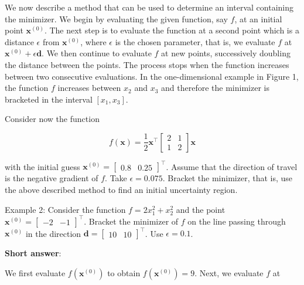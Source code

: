 We now describe a method that can be used to determine an interval containing the minimizer. We begin by evaluating the given function, say \(f\), at an initial point \(\boldsymbol{x}^{(0)}\). The next step is to evaluate the function at a second point which is a distance \(\epsilon\) from \(\boldsymbol{x}^{(0)}\), where \(\epsilon\) is the chosen parameter, that is, we evaluate \(f\) at \(\boldsymbol{x}^{(0)}+\epsilon \boldsymbol{d}\). We then continue to evaluate \(f\) at new points, successively doubling the distance between the points. The process stops when the function increases between two consecutive evaluations. In the one-dimensional example in Figure 1, the function \(f\) increases between \(x_{2}\) and \(x_{3}\) and therefore the minimizer is bracketed in the interval \(\left[x_{1}, x_{3}\right]\).

Consider now the function

\begin{equation*}
	f(\boldsymbol{x})=\frac{1}{2} \boldsymbol{x}^{\top}\left[\begin{array}{ll}
		2 & 1 \\
		1 & 2
	\end{array}\right] \boldsymbol{x}
\end{equation*}

with the initial guess \(\boldsymbol{x}^{(0)}=\left[\begin{array}{ll}0.8 & 0.25\end{array}\right]^{\top}\). Assume that the direction of travel is the negative gradient of \(f\). Take \(\epsilon=0.075\). Bracket the minimizer, that is, use the above described method to find an initial uncertainty region.

\medskip

\noindent
Example 2: Consider the function \(f=2 x_{1}^{2}+x_{2}^{2}\) and the point \(\boldsymbol{x}^{(0)}=\left[\begin{array}{ll}-2 & -1\end{array}\right]^{\top}\). Bracket the minimizer of \(f\) on the line passing through \(\boldsymbol{x}^{(0)}\) in the direction \(\boldsymbol{d}=\left[\begin{array}{ll}10 & 10\end{array}\right]^{\top}\). Use \(\epsilon=0.1\).

\textbf{Short answer}:

We first evaluate \(f\left(\boldsymbol{x}^{(0)}\right)\) to obtain \(f\left(\boldsymbol{x}^{(0)}\right)=9\). Next, we evaluate \(f\) at

